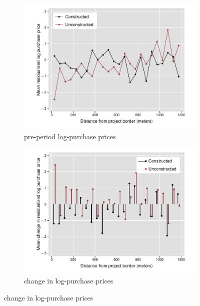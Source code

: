 \documentclass[12pt]{article}
\begin{document}
\begin{figure}[t!]
        \centering
        \caption[ House Prices outside Constructed and Unconstructed Projects Areas ]
        {\small House Prices outside Constructed and Unconstructed projects } 
        \begin{subfigure}[b]{0.495\textwidth}
            \centering
            \includegraphics[width=\textwidth,trim={1.1cm .3cm 0.1cm 0cm}, clip=true]{figures/price_pre_means}
            \caption[Network2]%
            {{\small pre-period log-purchase prices }}    
            \label{fig:preprice}
        \end{subfigure}
        \hfill
        \begin{subfigure}[b]{0.495\textwidth}   
            \centering 
            \includegraphics[width=\textwidth,trim={1.1cm .3cm 0.1cm 0cm}, clip=true]{figures/prices_rawchanges}
            \caption[]%
            {{\small change in log-purchase prices}}    
            \label{fig:changeprice}
        \end{subfigure}
        \label{fig:rawpricemeans}
        \vspace{-6mm}
\end{figure} 
\end{document}
